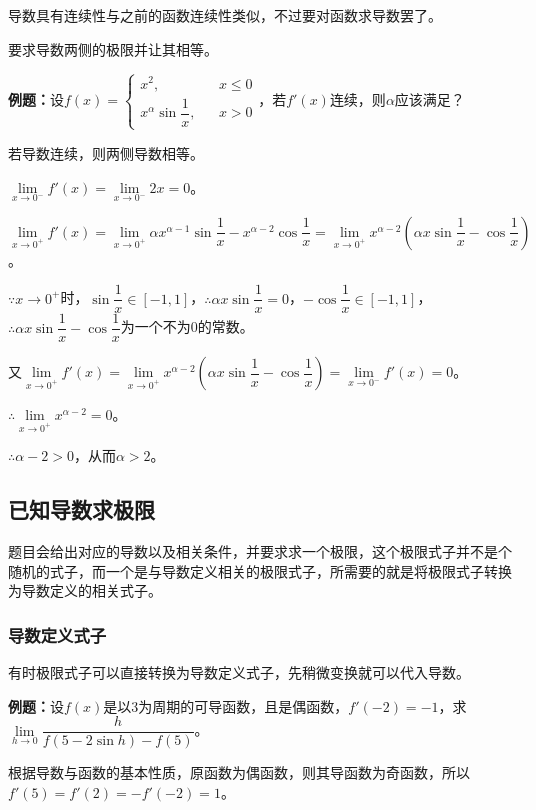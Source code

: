 导数具有连续性与之前的函数连续性类似，不过要对函数求导数罢了。

要求导数两侧的极限并让其相等。\medskip

\textbf{例题：}设$f(x)=\left\{\begin{array}{lcl}
                              x^2,                      & & x\leqslant 0 \\
                              x^\alpha\sin\dfrac{1}{x}, & & x>0
\end{array}
\right.$，若$f'(x)$连续，则$\alpha$应该满足？

若导数连续，则两侧导数相等。

$\lim\limits_{x\to 0^-}f'(x)=\lim\limits_{x\to 0^-}2x=0$。

$\lim\limits_{x\to 0^+}f'(x)=\lim\limits_{x\to 0^+}\alpha x^{\alpha-1}\sin\dfrac{1}{x}-x^{\alpha-2}\cos\dfrac{1}{x}=\lim\limits_{x\to 0^+}x^{\alpha-2}\left(\alpha x\sin\dfrac{1}{x}-\cos\dfrac{1}{x}\right)$。

$\because x\to 0^+$时，$\sin\dfrac{1}{x}\in[-1,1]$，$\therefore\alpha x\sin\dfrac{1}{x}=0$，$-\cos\dfrac{1}{x}\in[-1,1]$，$\therefore \alpha x\sin\dfrac{1}{x}-\cos\dfrac{1}{x}$为一个不为0的常数。

又$\lim\limits_{x\to 0^+}f'(x)=\lim\limits_{x\to 0^+}x^{\alpha-2}\left(\alpha x\sin\dfrac{1}{x}-\cos\dfrac{1}{x}\right)=\lim\limits_{x\to 0^-}f'(x)=0$。

$\therefore\lim\limits_{x\to 0^+}x^{\alpha-2}=0$。

$\therefore\alpha-2>0$，从而$\alpha>2$。

\subsection{已知导数求极限}

题目会给出对应的导数以及相关条件，并要求求一个极限，这个极限式子并不是个随机的式子，而一个是与导数定义相关的极限式子，所需要的就是将极限式子转换为导数定义的相关式子。

\subsubsection{导数定义式子}

有时极限式子可以直接转换为导数定义式子，先稍微变换就可以代入导数。

\textbf{例题：}设$f(x)$是以3为周期的可导函数，且是偶函数，$f'(-2)=-1$，求$\lim\limits_{h\to 0}\dfrac{h}{f(5-2\sin h)-f(5)}$。\medskip

根据导数与函数的基本性质，原函数为偶函数，则其导函数为奇函数，所以$f'(5)=f'(2)=-f'(-2)=1$。

